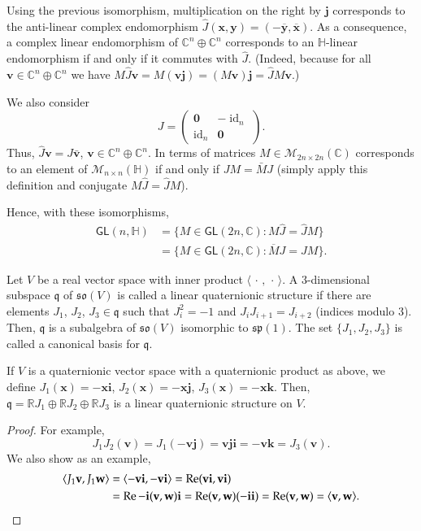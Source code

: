 \documentclass[12pt, a4paper]{amsart}
\newcommand{\id}{\operatorname{id}}
\newcommand{\g}{\mathfrak}
\newcommand{\R}{\mathbb{R}}
\newcommand{\C}{\mathbb{C}}
\renewcommand{\H}{\mathbb{H}}
\renewcommand{\Re}{\operatorname{Re}}
\theoremstyle{remark}
\begin{document}
Using the previous isomorphism, multiplication on the right by $\mathbf{j}$ corresponds to the anti-linear complex endomorphism $\hat{J}(\mathbf{x},\mathbf{y})=(-\overline{\mathbf{y}},\overline{\mathbf{x}})$.
As a consequence, a complex linear endomorphism of $\C^n\oplus\C^n$ corresponds to an $\H$-linear endomorphism if and only if it commutes with $\hat{J}$. 
(Indeed, because for all $\mathbf{v}\in\C^n\oplus\C^n$ we have $M\hat{J}\mathbf{v}=M(\mathbf{v}\mathbf{j})=(M\mathbf{v})\mathbf{j}=\hat{J}M\mathbf{v}$.)

We also consider
\[
{J}=
\begin{pmatrix}
\mathbf{0} & -\id_n\\
\id_n & \mathbf{0}
\end{pmatrix}.
\]
Thus, $\hat{J}\mathbf{v}=J\bar{\mathbf{v}}$, $\mathbf{v}\in\C^n\oplus\C^n$.
In terms of matrices $M\in\mathcal{M}_{2n\times 2n}(\C)$ corresponds to an element of $\mathcal{M}_{n\times n}(\H)$ if and only if $JM=\bar{M}J$
(simply apply this definition and conjugate $M\hat{J}=\hat{J}M$).

Hence, with these isomorphisms, 
\[
\begin{aligned}
\mathsf{GL}(n,\H)
&{}=\{M\in\mathsf{GL}(2n,\C):M\hat{J}=\hat{J}M\}\\
&{}=\{M\in\mathsf{GL}(2n,\C):\overline{M}J=JM\}.
\end{aligned}
\]
\medskip

Let $V$ be a real vector space with inner product $\langle\,\cdot\,,\,\cdot\,\rangle$.
A $3$-dimensional subspace $\g{q}$ of $\g{so}(V)$ is called a linear quaternionic structure if there are elements $J_1$, $J_2$, $J_3\in\g{q}$ such that $J_i^2=-1$ and $J_iJ_{i+1}=J_{i+2}$ (indices modulo 3).
Then, $\g{q}$ is a subalgebra of $\g{so}(V)$ isomorphic to $\g{sp}(1)$.
The set $\{J_1,J_2,J_3\}$ is called a canonical basis for $\g{q}$.

If $V$ is a quaternionic vector space with a quaternionic product as above, we define $J_1(\mathbf{x})=-\mathbf{x}\mathbf{i}$, $J_2(\mathbf{x})=-\mathbf{x}\mathbf{j}$, $J_3(\mathbf{x})=-\mathbf{x}\mathbf{k}$.
Then, $\g{q}=\R J_1\oplus\R J_2\oplus\R J_3$ is a linear quaternionic structure on $V$.

\begin{proof}
For example,
\[
J_1 J_2(\mathbf{v})
=J_1(-\mathbf{v}\mathbf{j})
=\mathbf{v}\mathbf{j}\mathbf{i}
=-\mathbf{v}\mathbf{k}
=J_3(\mathbf{v}).
\]
We also show as an example,
\begin{align*}
\langle J_1\mathbf{v},J_1\mathbf{w}\rangle
&{}=\langle -\mathbf{v}\mathbf{i},-\mathbf{v}\mathbf{i}\rangle
=\Re (\mathbf{v}\mathbf{i},\mathbf{v}\mathbf{i})\\
&{}=\Re -\mathbf{i} (\mathbf{v},\mathbf{w}) \mathbf{i}
=\Re (\mathbf{v},\mathbf{w}) (-\mathbf{i}\mathbf{i})
=\Re (\mathbf{v},\mathbf{w})
=\langle \mathbf{v},\mathbf{w}\rangle.\qedhere
\end{align*}
\end{proof}
\end{document}
